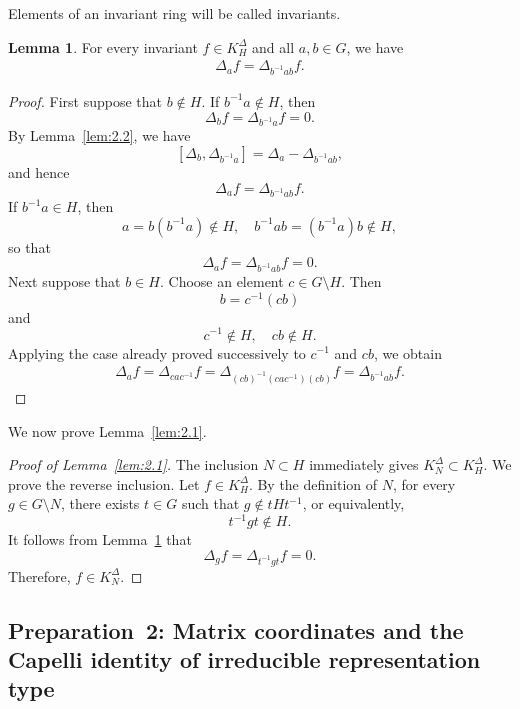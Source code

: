\documentclass[12pt,a4paper]{article}
\theoremstyle{definition}
\newtheorem{lem}[definition]{Lemma}
\numberwithin{definition}{section}
\begin{document}
Elements of an invariant ring will be called invariants.

\begin{lem}\label{lem:2.3}
For every invariant $f\in K_H^\Delta$ and all $a,b\in G$, we have
\begin{align*}
 \Delta_{a} f = \Delta_{b^{-1} a b} f.
\end{align*}
\end{lem}
\begin{proof}
First suppose that $b\notin H$.
If $b^{-1}a\notin H$, then
\[
\Delta_{b} f = \Delta_{b^{-1}a} f = 0.
\]
By Lemma~\ref{lem:2.2}, we have
\[
[\Delta_b,\Delta_{b^{-1}a}]
=
\Delta_a-\Delta_{b^{-1}ab},
\]
and hence
\[
 \Delta_{a} f = \Delta_{b^{-1}ab}f.
\]
If $b^{-1}a\in H$, then
\[
a = b(b^{-1}a) \notin H, \quad b^{-1}ab=(b^{-1}a)b \notin H,
\]
so that
\[
 \Delta_af=\Delta_{b^{-1}ab}f=0.
\]
Next suppose that $b\in H$.
Choose an element $c\in G\setminus H$.
Then
\[
b = c^{-1}(cb)
\]
and
\[
 c^{-1} \notin H, \quad c b \notin H.
\]
Applying the case already proved successively to $c^{-1}$ and $cb$, we obtain
\begin{align*}
 \Delta_a f
 =\Delta_{c a c^{-1}} f
 =\Delta_{(cb)^{-1}(c a c^{-1})(cb)}f
 =\Delta_{b^{-1}ab}f.
\end{align*}
\end{proof}

We now prove Lemma~\ref{lem:2.1}.

\begin{proof}[Proof of Lemma~\ref{lem:2.1}]
The inclusion $N\subset H$ immediately gives
$K_N^\Delta\subset K_H^\Delta$.
We prove the reverse inclusion.
Let $f\in K_H^\Delta$.
By the definition of $N$, for every $g\in G\setminus N$,
there exists $t\in G$ such that $g\notin tHt^{-1}$, or equivalently,
\[
t^{-1} g t \notin H.
\]
It follows from Lemma~\ref{lem:2.3} that
\[
 \Delta_g f
 =\Delta_{t^{-1} g t}f
 =0.
\]
Therefore, $f\in K_N^\Delta$.
\end{proof}

\subsection{Preparation~2: Matrix coordinates and the Capelli identity of irreducible representation type}\label{sec:2.2}
\end{document}
